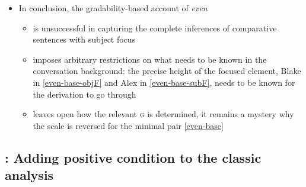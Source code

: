 \documentclass[11pt,letterpaper]{scrartcl}
\begin{document}
\begin{itemize}
    \item In conclusion, the gradability-based account of \textit{even}
    
    \begin{itemize}
        \item is unsuccessful in capturing the complete inferences of comparative sentences with subject focus 
        
        \item imposes arbitrary restrictions on what needs to be known in the conversation background: the precise height of the focused element, Blake in \ref{even-base-objF} and Alex in \ref{even-base-subF}, needs to be known for the derivation to go through
        
        \item leaves open how the relevant \textsc{g} is determined, it remains a mystery why the scale is reversed for the minimal pair \ref{even-base}
    \end{itemize}
    
\end{itemize}

\subsection{\cite{daniels_even_2020}: Adding positive condition to the classic analysis}
\end{document}
